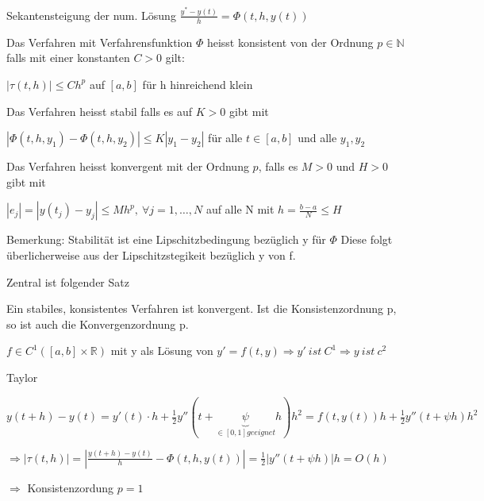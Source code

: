 \documentclass[10pt,a4paper]{article}
\begin{document}
Sekantensteigung der num. Lösung $\frac{y^{*}-y(t)}{h}=\Phi(t,h,y(t))$


\begin{defi}
Das Verfahren mit Verfahrensfunktion $\Phi$ heisst konsistent von der Ordnung $p \in \mathbb{N}$ falls mit einer konstanten $C>0$ gilt:


$|\tau(t,h)| \leq C h^{p}$ auf $[a,b]$ für h hinreichend klein

\end{defi}
\begin{defi}
Das Verfahren heisst stabil falls es auf $K>0$ gibt mit

$|\Phi(t,h,y_1)-\Phi(t,h,y_2)| \leq K|y_1-y_2|$ für alle $t\in [a,b]$ und alle $y_1,y_2$

\end{defi}

\begin{defi}
Das Verfahren heisst konvergent mit der Ordnung $p$, falls es $M>0$ und $H>0$ gibt mit

$|e_j|=|y(t_j)-y_j|\leq Mh^{p}, ~ \forall j=1, \ldots , N$ auf alle N mit $h=\frac{b-a}{N} \leq H$
\end{defi}


Bemerkung: Stabilität ist eine Lipschitzbedingung bezüglich y für $\Phi$ Diese folgt überlicherweise aus der Lipschitzstegikeit bezüglich y von f.

Zentral ist folgender Satz

\begin{satz}

Ein stabiles, konsistentes Verfahren ist konvergent. Ist die Konsistenzordnung p, so ist auch die Konvergenzordnung p.

\end{satz}


\begin{bsp}



$f \in C^{1}([a,b]\times \mathbb{R})$ mit y als Lösung von $y'=f(t,y) \Rightarrow y' ~ ist ~ C^{1} \Rightarrow y ~ ist~ c^{2}$

Taylor

$y(t+h)-y(t)=y'(t)\cdot h + \frac{1}{2} y''(t+\underbrace{\psi}_{\in [0,1] geeignet} h)h^{2} = f(t,y(t))h+\frac{1}{2}y''(t+\psi h)h^{2}$

$\Rightarrow |\tau(t,h)|=\left|  \frac{y(t+h)-y(t)}{h} - \Phi(t,h,y(t))   \right| = \frac{1}{2}|y''(t+\psi h)|h = O(h)$

$\Rightarrow$ Konsistenzordung $p=1$


\end{bsp}
\end{document}
